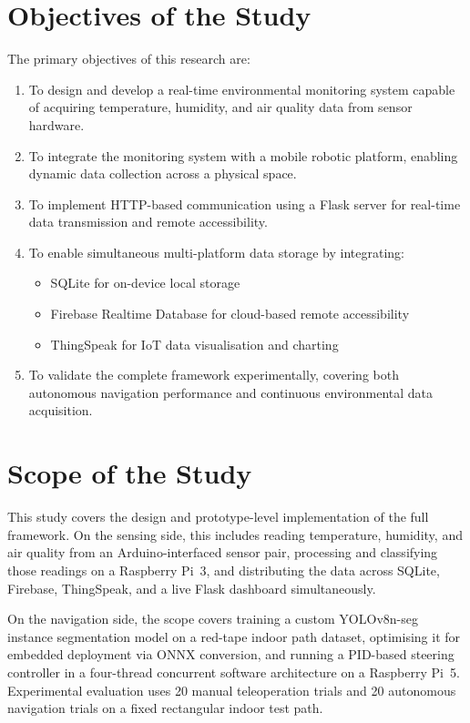 \section{Objectives of the Study}

The primary objectives of this research are:

\begin{enumerate}
    \item To design and develop a real-time environmental monitoring
          system capable of acquiring temperature, humidity, and air
          quality data from sensor hardware.
    \item To integrate the monitoring system with a mobile robotic
          platform, enabling dynamic data collection across a physical
          space.
    \item To implement HTTP-based communication using a Flask server
          for real-time data transmission and remote accessibility.
    \item To enable simultaneous multi-platform data storage by
          integrating:
          \begin{itemize}
              \item SQLite for on-device local storage
              \item Firebase Realtime Database for cloud-based remote
                    accessibility
              \item ThingSpeak for IoT data visualisation and charting
          \end{itemize}
    \item To validate the complete framework experimentally, covering
          both autonomous navigation performance and continuous
          environmental data acquisition.
\end{enumerate}

\section{Scope of the Study}

This study covers the design and prototype-level implementation of the
full framework. On the sensing side, this includes reading temperature,
humidity, and air quality from an Arduino-interfaced sensor pair,
processing and classifying those readings on a Raspberry Pi~3, and
distributing the data across SQLite, Firebase, ThingSpeak, and a
live Flask dashboard simultaneously.

On the navigation side, the scope covers training a custom YOLOv8n-seg
instance segmentation model on a red-tape indoor path dataset,
optimising it for embedded deployment via ONNX conversion, and running
a PID-based steering controller in a four-thread concurrent software
architecture on a Raspberry Pi~5. Experimental evaluation uses 20
manual teleoperation trials and 20 autonomous navigation trials on a
fixed rectangular indoor test path.

